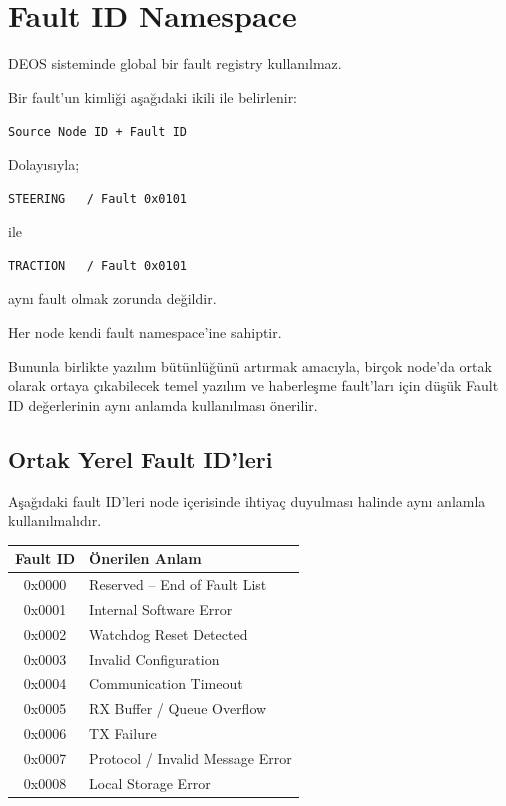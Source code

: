 \documentclass[a4paper,11pt]{article}
\begin{document}
\section{Fault ID Namespace}

DEOS sisteminde global bir fault registry kullanılmaz.

Bir fault'un kimliği aşağıdaki ikili ile belirlenir:

\begin{center}
\texttt{Source Node ID + Fault ID}
\end{center}

Dolayısıyla;

\begin{lstlisting}
STEERING   / Fault 0x0101
\end{lstlisting}

ile

\begin{lstlisting}
TRACTION   / Fault 0x0101
\end{lstlisting}

aynı fault olmak zorunda değildir.

Her node kendi fault namespace'ine sahiptir.

Bununla birlikte yazılım bütünlüğünü artırmak amacıyla,
birçok node'da ortak olarak ortaya çıkabilecek temel yazılım ve
haberleşme fault'ları için düşük Fault ID değerlerinin aynı anlamda
kullanılması önerilir.

\subsection{Ortak Yerel Fault ID'leri}

Aşağıdaki fault ID'leri node içerisinde ihtiyaç duyulması halinde
aynı anlamla kullanılmalıdır.

\begin{center}
\begin{tabular}{c l}
\toprule
\textbf{Fault ID} & \textbf{Önerilen Anlam} \\
\midrule
0x0000 & Reserved -- End of Fault List \\
0x0001 & Internal Software Error \\
0x0002 & Watchdog Reset Detected \\
0x0003 & Invalid Configuration \\
0x0004 & Communication Timeout \\
0x0005 & RX Buffer / Queue Overflow \\
0x0006 & TX Failure \\
0x0007 & Protocol / Invalid Message Error \\
0x0008 & Local Storage Error \\
\bottomrule
\end{tabular}
\end{center}
\end{document}
